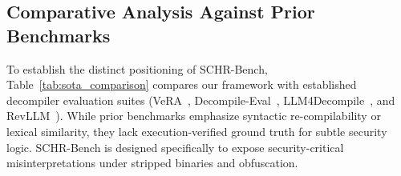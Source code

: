 \documentclass[conference]{IEEEtran}
\begin{document}
\begin{table}[t]
\centering
\caption{Effect of Obfuscation Levels (OLLVM) on SCHR (\%).}
\label{tab:obfuscation}
\end{table}

\subsection{Comparative Analysis Against Prior Benchmarks}
To establish the distinct positioning of SCHR-Bench, Table~\ref{tab:sota_comparison} compares our framework with established decompiler evaluation suites (VeRA~\cite{alrabaee2022vera}, Decompile-Eval~\cite{decompileeval2024}, LLM4Decompile~\cite{sun2024llm4decompile}, and RevLLM~\cite{revllm2024}). While prior benchmarks emphasize syntactic re-compilability or lexical similarity, they lack execution-verified ground truth for subtle security logic. SCHR-Bench is designed specifically to expose security-critical misinterpretations under stripped binaries and obfuscation.
\end{document}

